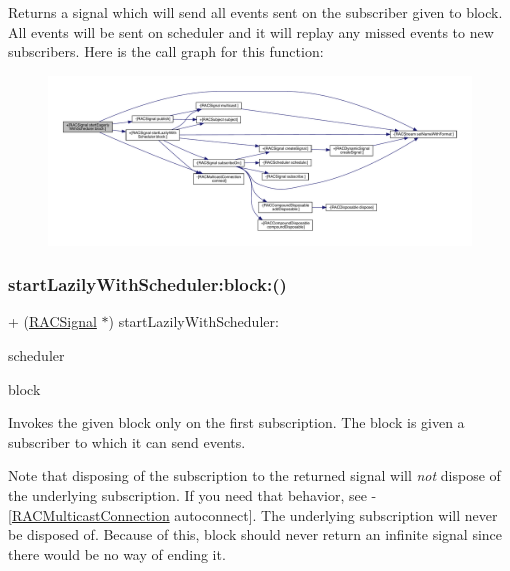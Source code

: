 Returns a signal which will send all events sent on the subscriber given to {\ttfamily block}. All events will be sent on {\ttfamily scheduler} and it will replay any missed events to new subscribers. Here is the call graph for this function\+:\nopagebreak
\begin{figure}[H]
\begin{center}
\leavevmode
\includegraphics[width=350pt]{interface_r_a_c_signal_a6bee49e8a8ee2f41bcec31bb86948b37_cgraph}
\end{center}
\end{figure}
\mbox{\label{interface_r_a_c_signal_adbef9afea68ea6a2a81bb3115f47c22c}} 
\subsubsection{\texorpdfstring{start\+Lazily\+With\+Scheduler\+:block\+:()}{startLazilyWithScheduler:block:()}\hspace{0.1cm}{\footnotesize\ttfamily [1/3]}}
{\footnotesize\ttfamily + (\mbox{\hyperlink{interface_r_a_c_signal}{R\+A\+C\+Signal}} $\ast$) start\+Lazily\+With\+Scheduler\+: \begin{DoxyParamCaption}\item[{(\mbox{\hyperlink{interface_r_a_c_scheduler}{R\+A\+C\+Scheduler}} $\ast$)}]{scheduler }\item[{block:(void($^\wedge$)(id$<$ \mbox{\hyperlink{interface_r_a_c_subscriber}{R\+A\+C\+Subscriber}} $>$ subscriber))}]{block }\end{DoxyParamCaption}}

Invokes the given block only on the first subscription. The block is given a subscriber to which it can send events.

Note that disposing of the subscription to the returned signal will {\itshape not} dispose of the underlying subscription. If you need that behavior, see -\/\mbox{[}\mbox{\hyperlink{interface_r_a_c_multicast_connection}{R\+A\+C\+Multicast\+Connection}} autoconnect\mbox{]}. The underlying subscription will never be disposed of. Because of this, {\ttfamily block} should never return an infinite signal since there would be no way of ending it.


